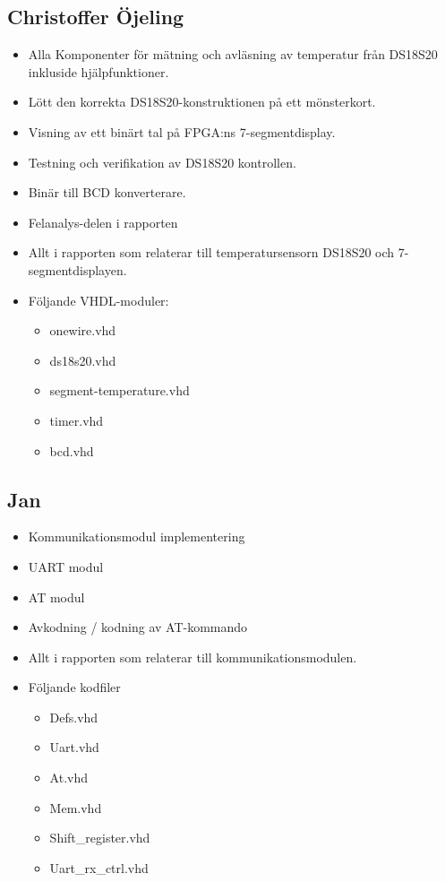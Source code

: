 \documentclass[a4paper]{scrartcl}
\begin{document}
\subsection{Christoffer Öjeling}
\begin{itemize}
	\item Alla Komponenter för mätning och avläsning av temperatur från DS18S20 inkluside hjälpfunktioner.
	\item Lött den korrekta DS18S20-konstruktionen på ett mönsterkort.
	\item Visning av ett binärt tal på FPGA:ns 7-segmentdisplay.
	\item Testning och verifikation av DS18S20 kontrollen.
	\item Binär till BCD konverterare.
	\item Felanalys-delen i rapporten
	\item Allt i rapporten som relaterar till temperatursensorn DS18S20 och 7-segmentdisplayen.
	\item Följande VHDL-moduler:
	\begin{itemize}
		\item onewire.vhd
		\item ds18s20.vhd
		\item segment-temperature.vhd
		\item timer.vhd
		\item bcd.vhd
	\end{itemize}
\end{itemize}

\subsection{Jan}
\begin{itemize}
	\item Kommunikationsmodul implementering
	\item UART modul
	\item AT modul
	\item Avkodning / kodning av AT-kommando
	\item Allt i rapporten som relaterar till kommunikationsmodulen.
	\item Följande kodfiler
		\begin{itemize}
		\item Defs.vhd
		\item Uart.vhd
		\item At.vhd
		\item Mem.vhd
		\item Shift\_register.vhd
		\item Uart\_rx\_ctrl.vhd
		\end{itemize}
\end{itemize}
\end{document}
